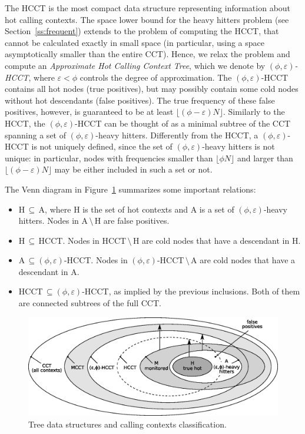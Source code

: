 \documentclass[preprint]{sigplanconf}
\begin{document}
The HCCT is the most compact data structure representing information about hot calling contexts. The space lower bound for the heavy hitters problem (see Section~\ref{ss:frequent}) extends to the problem of computing the HCCT, that cannot be calculated exactly in small space (in particular, using a space asymptotically smaller than the entire CCT). Hence, we relax the problem and compute an {\em Approximate Hot Calling Context Tree}, which we denote by {\em $(\phi,\varepsilon)$-HCCT}, where $\varepsilon<\phi$ controls the degree of approximation. The $(\phi,\varepsilon)$-HCCT contains all hot nodes (true positives), but may possibly contain some cold nodes without hot descendants (false positives). The true frequency of these false positives, however, is guaranteed to be at least $\lfloor(\phi-\varepsilon) N\rfloor$. Similarly to the HCCT, the $(\phi,\varepsilon)$-HCCT can be thought of as a minimal subtree of the CCT spanning a set of $(\phi,\varepsilon)$-heavy hitters. Differently from the HCCT, a $(\phi,\varepsilon)$-HCCT is not uniquely defined, since the set of $(\phi,\varepsilon)$-heavy hitters is not unique: in particular, nodes with frequencies smaller than $\lfloor\phi N\rfloor$ and larger than $\lfloor(\phi-\varepsilon) N\rfloor$ may be either included in such a set or not.

The Venn diagram in Figure~\ref{fig:venn} summarizes some important relations:

\begin{itemize}

\item H$\,\subseteq\,$A, where H is the set of hot contexts and A is a set of $(\phi,\varepsilon)$-heavy hitters. Nodes in A$\,\setminus\,$H are false positives.

\item H$\,\subseteq\,$HCCT. Nodes in HCCT$\,\setminus\,$H are cold nodes that have a descendant in H.

\item A$\,\subseteq$$(\phi,\varepsilon)$-HCCT. Nodes in $(\phi,\varepsilon)$-HCCT$\,\setminus\,$A are cold nodes that have a descendant in A.

\item HCCT$\,\subseteq$$(\phi,\varepsilon)$-HCCT, as implied by the previous inclusions. Both of them are connected subtrees of the full CCT.

\end{itemize}

\begin{figure}[t]
\center\includegraphics[width=8.2 cm]{venn.eps}
\caption{Tree data structures and calling contexts classification.}
\label{fig:venn}
\end{figure} 
\end{document}
